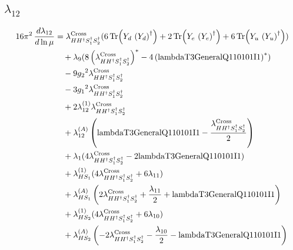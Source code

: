 \documentclass[10pt,a4paper]{article}
\begin{document}
\subsection*{$\lambda_{12}$}
\begin{align*}
16\pi^2\,\frac{d \lambda_{12}}{d\ln\mu} &={\lambda_{H H^\dagger S_1^\dagger S_2^\dagger}^{\rm Cross}} (6 \operatorname{Tr}\!\left({Y_d}\,\left({Y_d}\right)^{\dagger}\right)+2 \operatorname{Tr}\!\left({Y_e}\,\left({Y_e}\right)^{\dagger}\right)+6 \operatorname{Tr}\!\left({Y_u}\,\left({Y_u}\right)^{\dagger}\right)) \\
&\quad +{\lambda_{9}} (8 \left({\lambda_{H H^\dagger S_1^\dagger S_2^\dagger}^{\rm Cross}}\right)^{*}-4 \left(\text{lambdaT3GeneralQ110101I1}\right)^{*}) \\
&\quad -9 {g_2}^2 {\lambda_{H H^\dagger S_1^\dagger S_2^\dagger}^{\rm Cross}} \\
&\quad -3 {g_1}^2 {\lambda_{H H^\dagger S_1^\dagger S_2^\dagger}^{\rm Cross}} \\
&\quad +2 {\lambda_{12}^{(1)}} {\lambda_{H H^\dagger S_1^\dagger S_2^\dagger}^{\rm Cross}} \\
&\quad +{\lambda_{12}^{(A)}} \left(\text{lambdaT3GeneralQ110101I1}-\frac{{\lambda_{H H^\dagger S_1^\dagger S_2^\dagger}^{\rm Cross}}}{2}\right) \\
&\quad +{\lambda_1} (4 {\lambda_{H H^\dagger S_1^\dagger S_2^\dagger}^{\rm Cross}}-2 \text{lambdaT3GeneralQ110101I1}) \\
&\quad +{\lambda_{HS_1}^{(1)}} (4 {\lambda_{H H^\dagger S_1^\dagger S_2^\dagger}^{\rm Cross}}+6 {\lambda_{11}}) \\
&\quad +{\lambda_{HS_1}^{(A)}} \left(2 {\lambda_{H H^\dagger S_1^\dagger S_2^\dagger}^{\rm Cross}}+\frac{{\lambda_{11}}}{2}+\text{lambdaT3GeneralQ110101I1}\right) \\
&\quad +{\lambda_{HS_2}^{(1)}} (4 {\lambda_{H H^\dagger S_1^\dagger S_2^\dagger}^{\rm Cross}}+6 {\lambda_{10}}) \\
&\quad +{\lambda_{HS_2}^{(A)}} \left(-2 {\lambda_{H H^\dagger S_1^\dagger S_2^\dagger}^{\rm Cross}}-\frac{{\lambda_{10}}}{2}-\text{lambdaT3GeneralQ110101I1}\right) \\
\end{align*}
\end{document}
